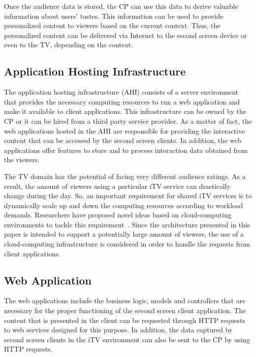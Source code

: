 \documentclass[journal]{IEEEtran}
\begin{document}
Once the audience data is stored, the CP can use this data to derive valuable information about users' tastes. This information can be used to provide personalized content to viewers based on the current context. Thus, the personalized content can be delivered via Internet to the second screen device or even to the TV, depending on the context.

\subsection{Application Hosting Infrastructure}

The application hosting infrastructure (AHI) consists of a server environment that provides the necessary computing resources to run a web application and make it available to client applications. This infrastructure can be owned by the CP or it can be hired from a third party service provider. As a matter of fact, the web applications hosted in the AHI are responsible for providing the interactive content that can be accessed by the second screen clients. In addition, the web applications offer features to store and to process interaction data obtained from the viewers.

The TV domain has the potential of facing very different audience ratings. As a result, the amount of viewers using a particular iTV service can drastically change during the day. So, an important requirement for shared iTV services is to dynamically scale up and down the computing resources according to workload demands. Researchers have proposed novel ideas based on cloud-computing environments to tackle this requirement~\cite{Lee2010,Lai2011}. Since the architecture presented in this paper is intended to support a potentially large amount of viewers, the use of a cloud-computing infrastructure is considered in order to handle the requests from client applications.

\subsection{Web Application}
\label{ssub_web_application}

The web applications include the business logic, models and controllers that are necessary for the proper functioning of the second screen client application. The content that is presented in the client can be requested through HTTP requests to web services designed for this purpose. In addition, the data captured by second screen clients in the iTV environment can also be sent to the CP by using HTTP requests. 
\end{document}
